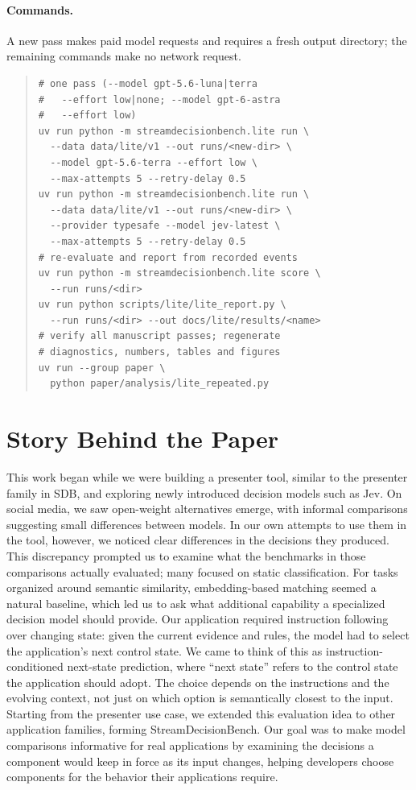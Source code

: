 \paragraph{Commands.}
A new pass makes paid model requests and requires a fresh output directory; the remaining commands make no network request.
\begin{quote}
\scriptsize
\begin{verbatim}
# one pass (--model gpt-5.6-luna|terra
#   --effort low|none; --model gpt-6-astra
#   --effort low)
uv run python -m streamdecisionbench.lite run \
  --data data/lite/v1 --out runs/<new-dir> \
  --model gpt-5.6-terra --effort low \
  --max-attempts 5 --retry-delay 0.5
uv run python -m streamdecisionbench.lite run \
  --data data/lite/v1 --out runs/<new-dir> \
  --provider typesafe --model jev-latest \
  --max-attempts 5 --retry-delay 0.5
# re-evaluate and report from recorded events
uv run python -m streamdecisionbench.lite score \
  --run runs/<dir>
uv run python scripts/lite/lite_report.py \
  --run runs/<dir> --out docs/lite/results/<name>
# verify all manuscript passes; regenerate
# diagnostics, numbers, tables and figures
uv run --group paper \
  python paper/analysis/lite_repeated.py
\end{verbatim}
\end{quote}

\FloatBarrier
\newpage
\section{Story Behind the Paper}
\label{app:story}

This work began while we were building a presenter tool, similar to the presenter family in SDB, and exploring newly introduced decision models such as Jev.
On social media, we saw open-weight alternatives emerge, with informal comparisons suggesting small differences between models.
In our own attempts to use them in the tool, however, we noticed clear differences in the decisions they produced.
This discrepancy prompted us to examine what the benchmarks in those comparisons actually evaluated; many focused on static classification.
For tasks organized around semantic similarity, embedding-based matching seemed a natural baseline, which led us to ask what additional capability a specialized decision model should provide.
Our application required instruction following over changing state: given the current evidence and rules, the model had to select the application's next control state.
We came to think of this as instruction-conditioned next-state prediction, where ``next state'' refers to the control state the application should adopt.
The choice depends on the instructions and the evolving context, not just on which option is semantically closest to the input.
Starting from the presenter use case, we extended this evaluation idea to other application families, forming StreamDecisionBench.
Our goal was to make model comparisons informative for real applications by examining the decisions a component would keep in force as its input changes, helping developers choose components for the behavior their applications require.
